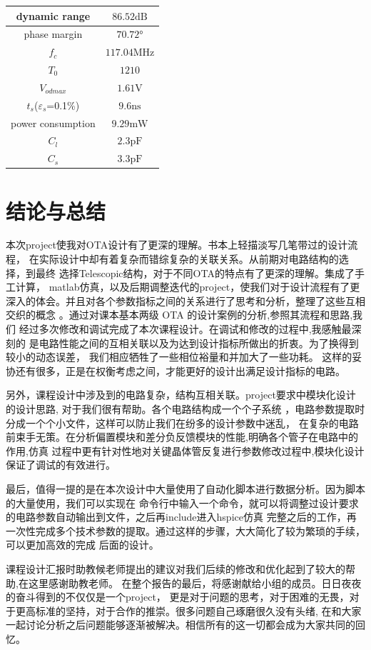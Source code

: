 \documentclass[a4paper]{article}
\newcommand{\uV}{\si{\volt}}
\newcommand{\upF}{\si{\pico\farad}}
\newcommand{\uns}{\si{\nano\second}}
\newcommand{\umW}{\si{\milli\watt}}
\newcommand{\uMHz}{\si{\mega\hertz}}
\newcommand{\udB}{\si{\deci\bel}}
\newcommand{\udeg}{\si{\degree}}
\begin{document}
\begin{table}[htbp]
    \begin{tabular}{|c|c|}
        \hline
        dynamic range&$86.52\udB$
        \\\hline
        phase margin&$70.72\udeg$
        \\\hline
        $f_c$ &$117.04\uMHz$
        \\\hline 
        $T_0$&$1210$
        \\\hline
        $V_{odmax}$&$1.61\uV$
        \\\hline
        $t_s$($\varepsilon_s$=0.1\%)&$9.6\uns$
        \\\hline
        power consumption&$9.29\umW$
        \\\hline
        $C_l$&$2.3\upF$
        \\\hline
        $C_s$&$3.3\upF$
        \\\hline
    \end{tabular}
\end{table}


\section{结论与总结}
本次project使我对OTA设计有了更深的理解。书本上轻描淡写几笔带过的设计流程，
在实际设计中却有着复杂而错综复杂的关联关系。从前期对电路结构的选择，到最终
选择Telescopic结构，对于不同OTA的特点有了更深的理解。集成了手工计算，
matlab仿真，以及后期调整迭代的project，使我们对于设计流程有了更
深入的体会。并且对各个参数指标之间的关系进行了思考和分析，整理了这些互相交织的概念
。通过对课本基本两级 OTA 的设计案例的分析,参照其流程和思路,我们
经过多次修改和调试完成了本次课程设计。在调试和修改的过程中,我感触最深刻的
是电路性能之间的互相关联以及为达到设计指标所做出的折衷。为了换得到较小的动态误差，
我们相应牺牲了一些相位裕量和并加大了一些功耗。
这样的妥协还有很多，正是在权衡考虑之间，才能更好的设计出满足设计指标的电路。

另外，课程设计中涉及到的电路复杂，结构互相关联。project要求中模块化设计的设计思路,
对于我们很有帮助。各个电路结构成一个个子系统
，电路参数提取时分成一个个小文件，这样可以防止我们在纷多的设计参数中迷乱，
在复杂的电路前束手无策。在分析偏置模块和差分负反馈模块的性能,明确各个管子在电路中的作用,仿真
过程中更有针对性地对关键晶体管反复进行参数修改过程中,模块化设计保证了调试的有效进行。

最后，值得一提的是在本次设计中大量使用了自动化脚本进行数据分析。因为脚本的大量使用，我们可以实现在
命令行中输入一个命令，就可以将调整过设计要求的电路参数自动输出到文件，之后再include进入hspice仿真
完整之后的工作，再一次性完成多个技术参数的提取。通过这样的步骤，大大简化了较为繁琐的手续，可以更加高效的完成
后面的设计。

课程设计汇报时助教候老师提出的建议对我们后续的修改和优化起到了较大的帮助,在这里感谢助教老师。
在整个报告的最后，将感谢献给小组的成员。日日夜夜的奋斗得到的不仅仅是一个project，
更是对于问题的思考，对于困难的无畏，对于更高标准的坚持，对于合作的推崇。很多问题自己琢磨很久没有头绪,
在和大家一起讨论分析之后问题能够逐渐被解决。相信所有的这一切都会成为大家共同的回忆。
\end{document}
